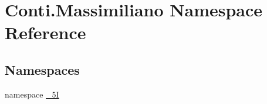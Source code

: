 \hypertarget{namespace_conti_1_1_massimiliano}{}\section{Conti.\+Massimiliano Namespace Reference}
\label{namespace_conti_1_1_massimiliano}
\subsection*{Namespaces}
\begin{DoxyCompactItemize}
\item 
namespace \hyperlink{namespace_conti_1_1_massimiliano_1_1__5_i}{\+\_\+5I}
\end{DoxyCompactItemize}
